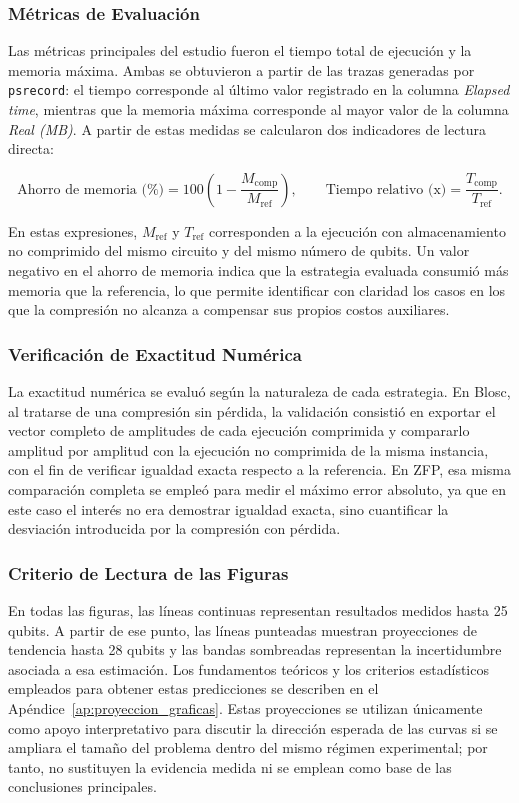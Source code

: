 \subsubsection{Métricas de Evaluación}

Las métricas principales del estudio fueron el tiempo total de ejecución y la memoria máxima. Ambas se obtuvieron a partir de las trazas generadas por \texttt{psrecord}: el tiempo corresponde al último valor registrado en la columna \textit{Elapsed time}, mientras que la memoria máxima corresponde al mayor valor de la columna \textit{Real (MB)}. A partir de estas medidas se calcularon dos indicadores de lectura directa:

\[
\text{Ahorro de memoria (\%)} = 100\left(1-\frac{M_{\text{comp}}}{M_{\text{ref}}}\right),
\qquad
\text{Tiempo relativo (x)} = \frac{T_{\text{comp}}}{T_{\text{ref}}}.
\]

En estas expresiones, $M_{\text{ref}}$ y $T_{\text{ref}}$ corresponden a la ejecución con almacenamiento no comprimido del mismo circuito y del mismo número de qubits. Un valor negativo en el ahorro de memoria indica que la estrategia evaluada consumió más memoria que la referencia, lo que permite identificar con claridad los casos en los que la compresión no alcanza a compensar sus propios costos auxiliares.

\subsubsection{Verificación de Exactitud Numérica}

La exactitud numérica se evaluó según la naturaleza de cada estrategia. En Blosc, al tratarse de una compresión sin pérdida, la validación consistió en exportar el vector completo de amplitudes de cada ejecución comprimida y compararlo amplitud por amplitud con la ejecución no comprimida de la misma instancia, con el fin de verificar igualdad exacta respecto a la referencia. En ZFP, esa misma comparación completa se empleó para medir el máximo error absoluto, ya que en este caso el interés no era demostrar igualdad exacta, sino cuantificar la desviación introducida por la compresión con pérdida.

\subsubsection{Criterio de Lectura de las Figuras}

En todas las figuras, las líneas continuas representan resultados medidos hasta 25 qubits. A partir de ese punto, las líneas punteadas muestran proyecciones de tendencia hasta 28 qubits y las bandas sombreadas representan la incertidumbre asociada a esa estimación. Los fundamentos teóricos y los criterios estadísticos empleados para obtener estas predicciones se describen en el Apéndice~\ref{ap:proyeccion_graficas}. Estas proyecciones se utilizan únicamente como apoyo interpretativo para discutir la dirección esperada de las curvas si se ampliara el tamaño del problema dentro del mismo régimen experimental; por tanto, no sustituyen la evidencia medida ni se emplean como base de las conclusiones principales.

